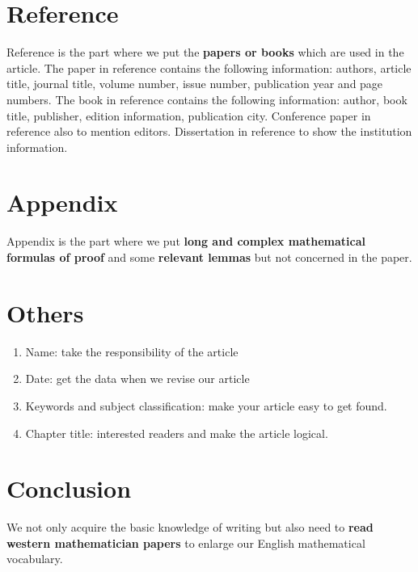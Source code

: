 \section{Reference}
Reference is the part where we put the \textbf{papers or books} which are used in the article. The paper in reference contains the following information: authors, article title, journal title, volume number, issue number, publication year and page numbers. The book in reference contains the following information: author, book title, publisher, edition information, publication city. Conference paper in reference also  to mention editors. Dissertation in reference  to show the institution information.



\section{Appendix}
Appendix is the part where we put \textbf{long and complex mathematical formulas of proof} and some \textbf{relevant lemmas} but not concerned in the paper.



\section{Others}
\begin{enumerate}
	\item Name: take the responsibility of the article
	\item Date: get the data when we revise our article
	\item Keywords and subject classification: make your article easy to get found.
	\item Chapter title: interested readers and make the article logical.
\end{enumerate}



\section{Conclusion}
We not only acquire the basic knowledge of writing but also need to \textbf{read western mathematician papers} to enlarge our English mathematical vocabulary.
